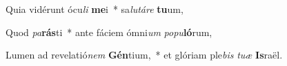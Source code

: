 \item Quia vidérunt ócu\textit{li} \textbf{me}i~* sa\textit{lu}\textit{tá}\textit{re} \textbf{tu}um,
\item Quod \textit{pa}\textbf{rás}ti~* ante fáciem ómni\textit{um} \textit{po}\textit{pu}\textbf{ló}rum,
\item Lumen ad revelatió\textit{nem} \textbf{Gén}tium,~* et glóriam ple\textit{bis} \textit{tu}\textit{æ} \textbf{Is}raël.
